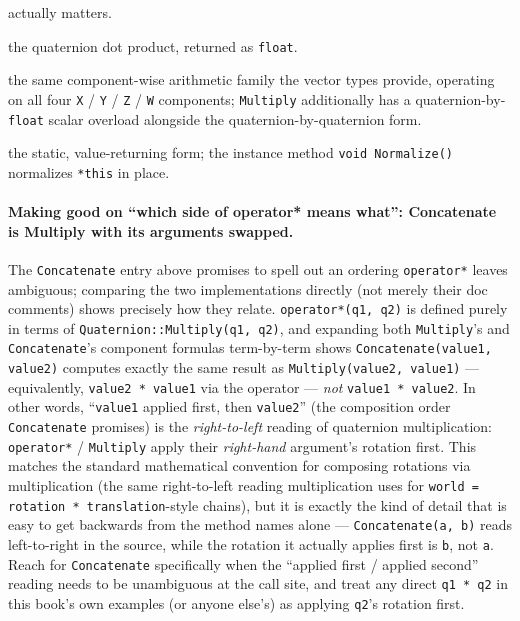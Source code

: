 \begin{description}
  actually matters.
\item[\texttt{Dot(quaternion1, quaternion2)}] the quaternion dot product, returned as
  \texttt{float}.
\item[\texttt{Add} / \texttt{Subtract} / \texttt{Multiply} / \texttt{Divide} / \texttt{Negate}] the same
  component-wise arithmetic family the vector types provide, operating on all four
  \texttt{X} / \texttt{Y} / \texttt{Z} / \texttt{W} components; \texttt{Multiply} additionally has a
  quaternion-by-\texttt{float} scalar overload alongside the quaternion-by-quaternion form.
\item[\texttt{Normalize(quaternion)}] the static, value-returning form; the instance method
  \texttt{void Normalize()} normalizes \texttt{*this} in place.
\end{description}

\paragraph{Making good on ``which side of operator* means what'': Concatenate is Multiply with its arguments swapped.}
The \texttt{Concatenate} entry above promises to spell out an ordering \texttt{operator*}
leaves ambiguous; comparing the two implementations directly (not merely their doc comments)
shows precisely how they relate. \texttt{operator*(q1, q2)} is defined purely in terms of
\texttt{Quaternion::Multiply(q1, q2)}, and expanding both \texttt{Multiply}'s and
\texttt{Concatenate}'s component formulas term-by-term shows
\texttt{Concatenate(value1, value2)} computes exactly the same result as
\texttt{Multiply(value2, value1)} --- equivalently, \texttt{value2 * value1} via the operator
--- \emph{not} \texttt{value1 * value2}. In other words, ``\texttt{value1} applied first, then
\texttt{value2}'' (the composition order \texttt{Concatenate} promises) is the
\emph{right-to-left} reading of quaternion multiplication: \texttt{operator*} / \texttt{Multiply}
apply their \emph{right-hand} argument's rotation first. This matches the standard mathematical
convention for composing rotations via multiplication (the same right-to-left reading
 multiplication uses for \texttt{world = rotation * translation}-style
chains), but it is exactly the kind of detail that is easy to get backwards from the method
names alone --- \texttt{Concatenate(a, b)} reads left-to-right in the source, while the
rotation it actually applies first is \texttt{b}, not \texttt{a}. Reach for
\texttt{Concatenate} specifically when the ``applied first / applied second'' reading needs to
be unambiguous at the call site, and treat any direct \texttt{q1 * q2} in this book's own
examples (or anyone else's) as applying \texttt{q2}'s rotation first.


